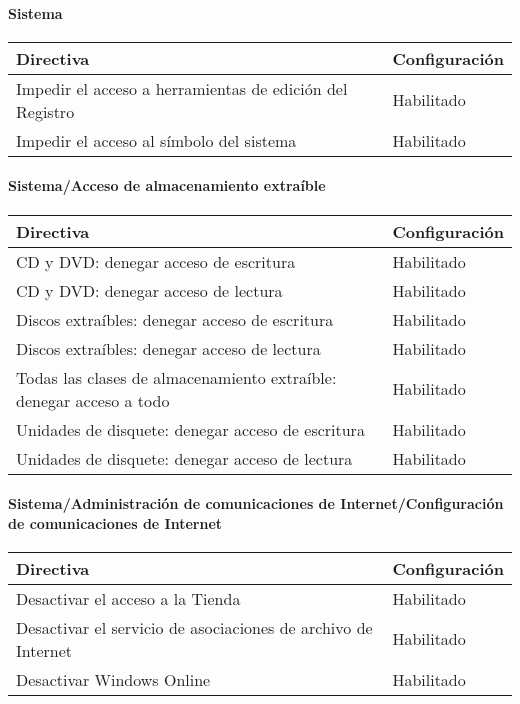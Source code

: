 \documentclass[
]{article}
\begin{document}
\hypertarget{sistema-1}{%
\paragraph{Sistema}\label{sistema-1}}

\begin{longtable}[]{@{}ll@{}}
\toprule
\textbf{Directiva} & \textbf{Configuración}\tabularnewline
\midrule
\endhead
Impedir el acceso a herramientas de edición del Registro &
Habilitado\tabularnewline
Impedir el acceso al símbolo del sistema & Habilitado\tabularnewline
\bottomrule
\end{longtable}

\hypertarget{sistemaacceso-de-almacenamiento-extrauxedble-1}{%
\paragraph{Sistema/Acceso de almacenamiento
extraíble}\label{sistemaacceso-de-almacenamiento-extrauxedble-1}}

\begin{longtable}[]{@{}ll@{}}
\toprule
\textbf{Directiva} & \textbf{Configuración}\tabularnewline
\midrule
\endhead
CD y DVD: denegar acceso de escritura & Habilitado\tabularnewline
CD y DVD: denegar acceso de lectura & Habilitado\tabularnewline
Discos extraíbles: denegar acceso de escritura &
Habilitado\tabularnewline
Discos extraíbles: denegar acceso de lectura & Habilitado\tabularnewline
Todas las clases de almacenamiento extraíble: denegar acceso a todo &
Habilitado\tabularnewline
Unidades de disquete: denegar acceso de escritura &
Habilitado\tabularnewline
Unidades de disquete: denegar acceso de lectura &
Habilitado\tabularnewline
\bottomrule
\end{longtable}

\hypertarget{sistemaadministraciuxf3n-de-comunicaciones-de-internetconfiguraciuxf3n-de-comunicaciones-de-internet}{%
\paragraph{Sistema/Administración de comunicaciones de
Internet/Configuración de comunicaciones de
Internet}\label{sistemaadministraciuxf3n-de-comunicaciones-de-internetconfiguraciuxf3n-de-comunicaciones-de-internet}}

\begin{longtable}[]{@{}ll@{}}
\toprule
\textbf{Directiva} & \textbf{Configuración}\tabularnewline
\midrule
\endhead
Desactivar el acceso a la Tienda & Habilitado\tabularnewline
Desactivar el servicio de asociaciones de archivo de Internet &
Habilitado\tabularnewline
Desactivar Windows Online & Habilitado\tabularnewline
\bottomrule
\end{longtable}
\end{document}
